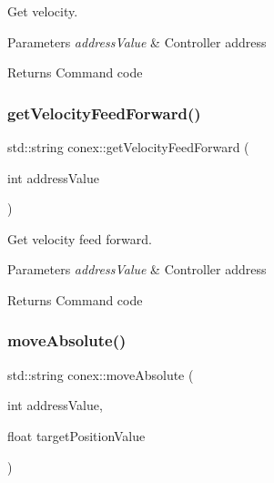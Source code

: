 Get velocity. 


\begin{DoxyParams}{Parameters}
{\em address\+Value} & Controller address \\
\hline
\end{DoxyParams}
\begin{DoxyReturn}{Returns}
Command code 
\end{DoxyReturn}
\mbox{\label{namespaceconex_aee916cc8cb9915577fc989826496fe6e}} 
\subsubsection{\texorpdfstring{get\+Velocity\+Feed\+Forward()}{getVelocityFeedForward()}}
{\footnotesize\ttfamily std\+::string conex\+::get\+Velocity\+Feed\+Forward (\begin{DoxyParamCaption}\item[{int}]{address\+Value }\end{DoxyParamCaption})}



Get velocity feed forward. 


\begin{DoxyParams}{Parameters}
{\em address\+Value} & Controller address \\
\hline
\end{DoxyParams}
\begin{DoxyReturn}{Returns}
Command code 
\end{DoxyReturn}
\mbox{\label{namespaceconex_ae52a8731032ef6b65b942aa0573d81cc}} 
\subsubsection{\texorpdfstring{move\+Absolute()}{moveAbsolute()}}
{\footnotesize\ttfamily std\+::string conex\+::move\+Absolute (\begin{DoxyParamCaption}\item[{int}]{address\+Value,  }\item[{float}]{target\+Position\+Value }\end{DoxyParamCaption})}



